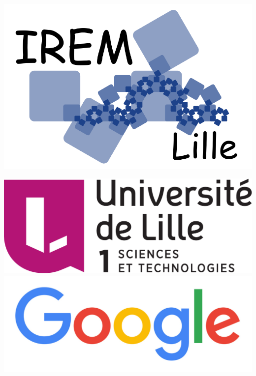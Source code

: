 \bigskip 

\begin{center}
\qquad\qquad\qquad
\includegraphics[scale=0.2]{../divers/logo_IREM_de_Lille.pdf}
\end{center}


\begin{center}
\includegraphics[scale=0.15]{../divers/logo-lille1-2014.pdf}\qquad
{}\qquad\qquad
\includegraphics[scale=0.1]{../divers/logo-google.jpg}
\end{center}



